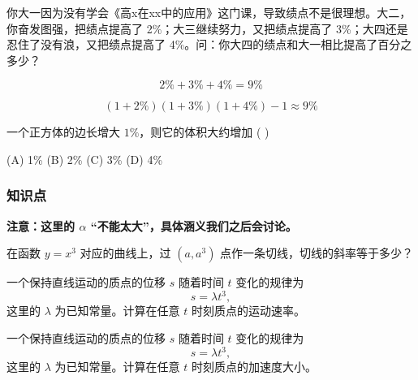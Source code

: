 \documentclass[CJK,13pt]{beamer}
\date{}
\begin{document}
  \bch
{}



\begin{frame}
  
  你大一因为没有学会《高x在xx中的应用》这门课，导致绩点不是很理想。大二，你奋发图强，把绩点提高了 2\%；大三继续努力，又把绩点提高了 3\%；大四还是忍住了没有浪，又把绩点提高了 4\%。问：你大四的绩点和大一相比提高了百分之多少？
\end{frame}


\begin{frame}
  
  $$  2\% + 3\% +4\% = 9\%$$

  
\end{frame}


\begin{frame}

  $$  (1+2\%)(1+3\%)(1+4\%)-1 \approx 9\% $$

\end{frame}


\begin{frame}
  一个正方体的边长增大 $1\%$，则它的体积大约增加 ( )

  \skipline
  
  (A) 1\% (B) 2\% (C) 3\% (D) 4\%
\end{frame}



\begin{frame}
  \frametitle{知识点}

{\bf 注意：这里的 $\alpha$ “不能太大”，具体涵义我们之后会讨论。}
\end{frame}


\begin{frame}
  在函数 $y=x^3$ 对应的曲线上，过 $(a, a^3)$ 点作一条切线，切线的斜率等于多少？
\end{frame}


\begin{frame}
  一个保持直线运动的质点的位移 $s$ 随着时间 $t$ 变化的规律为
  $$s = \lambda t^3,$$
  这里的 $\lambda$ 为已知常量。计算在任意 $t$ 时刻质点的运动速率。
\end{frame}


\begin{frame}
  一个保持直线运动的质点的位移 $s$ 随着时间 $t$ 变化的规律为
  $$s = \lambda t^3,$$
  这里的 $\lambda$ 为已知常量。计算在任意 $t$ 时刻质点的加速度大小。
\end{frame}
\end{document}
